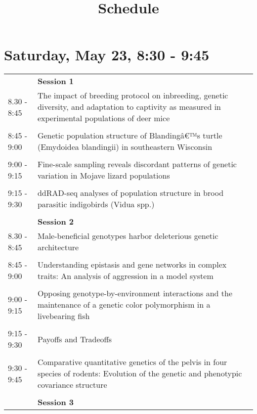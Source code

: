 \documentclass{article}
\title{Schedule}
\date{}
\begin{document}
\maketitle{}
\section{Saturday, May 23, 8:30 - 9:45}
\begin{longtabu} to \textwidth {lX}
 & \textbf{Session 1} \\ 

8.30 - 8:45 & The impact of breeding protocol on inbreeding, genetic diversity, and adaptation to captivity as measured in experimental populations of deer mice \\ 
 &  \\ 
8:45 - 9:00 & Genetic population structure of Blandingâ€™s turtle (Emydoidea blandingii) in southeastern Wisconsin \\ 
 &  \\ 
9:00 - 9:15 & Fine-scale sampling reveals discordant patterns of genetic variation in Mojave lizard populations \\ 
 &  \\ 
9:15 - 9:30 & ddRAD-seq analyses of population structure in brood parasitic indigobirds (Vidua spp.) \\ 
 &  \\ 
 & \textbf{Session 2} \\ 

8.30 - 8:45 & Male-beneficial genotypes harbor deleterious genetic architecture \\ 
 &  \\ 
8:45 - 9:00 & Understanding epistasis and gene networks in complex traits: An analysis of aggression in a model system \\ 
 &  \\ 
9:00 - 9:15 & Opposing genotype-by-environment interactions and the maintenance of a genetic color polymorphism in a livebearing fish \\ 
 &  \\ 
9:15 - 9:30 & Payoffs and Tradeoffs \\ 
 &  \\ 
9:30 - 9:45 & Comparative quantitative genetics of the pelvis in four species of rodents: Evolution of the genetic and phenotypic covariance structure \\ 
 &  \\ 
 & \textbf{Session 3} \\ 


\end{longtabu}
\end{document}
